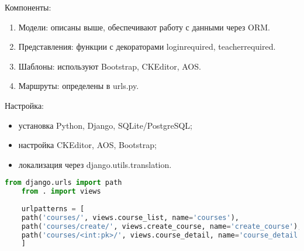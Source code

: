 Компоненты:
\begin{enumerate}
		\item Модели: описаны выше, обеспечивают работу с данными через ORM.
		\item Представления: функции с декораторами loginrequired, teacherrequired.
		\item Шаблоны: используют Bootstrap, CKEditor, AOS.
		\item Маршруты: определены в urls.py.
\end{enumerate}
		
Настройка:
\begin{itemize}
		\item установка Python, Django, SQLite/PostgreSQL;
		\item настройка CKEditor, AOS, Bootstrap;
		\item локализация через django.utils.translation.
\end{itemize}

\begin{lstlisting}[language=Python, caption=Маршруты приложения, label=lst:urls]
	from django.urls import path
	from . import views
	
	urlpatterns = [
	path('courses/', views.course_list, name='courses'),
	path('courses/create/', views.create_course, name='create_course'),
	path('courses/<int:pk>/', views.course_detail, name='course_detail'),
	]
\end{lstlisting}